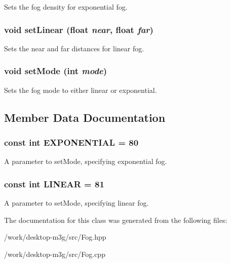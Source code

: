 Sets the fog density for exponential fog. \hypertarget{classm3g_1_1Fog_a46fd556865ae7f1c683c3741b68c168}{
\subsubsection[{setLinear}]{\setlength{\rightskip}{0pt plus 5cm}void setLinear (float {\em near}, \/  float {\em far})}}
\label{classm3g_1_1Fog_a46fd556865ae7f1c683c3741b68c168}


Sets the near and far distances for linear fog. \hypertarget{classm3g_1_1Fog_9f407b18ba6235cb96fa95611c1ea3a4}{
\subsubsection[{setMode}]{\setlength{\rightskip}{0pt plus 5cm}void setMode (int {\em mode})}}
\label{classm3g_1_1Fog_9f407b18ba6235cb96fa95611c1ea3a4}


Sets the fog mode to either linear or exponential. 

\subsection{Member Data Documentation}
\hypertarget{classm3g_1_1Fog_86b391da2e58c0448712a10f6609a62c}{
\subsubsection[{EXPONENTIAL}]{\setlength{\rightskip}{0pt plus 5cm}const int {\bf EXPONENTIAL} = 80}}
\label{classm3g_1_1Fog_86b391da2e58c0448712a10f6609a62c}


A parameter to setMode, specifying exponential fog. \hypertarget{classm3g_1_1Fog_23ccf193c67257f1be26417041cecb31}{
\subsubsection[{LINEAR}]{\setlength{\rightskip}{0pt plus 5cm}const int {\bf LINEAR} = 81}}
\label{classm3g_1_1Fog_23ccf193c67257f1be26417041cecb31}


A parameter to setMode, specifying linear fog. 

The documentation for this class was generated from the following files:\begin{CompactItemize}
\item 
/work/desktop-m3g/src/Fog.hpp\item 
/work/desktop-m3g/src/Fog.cpp\end{CompactItemize}
